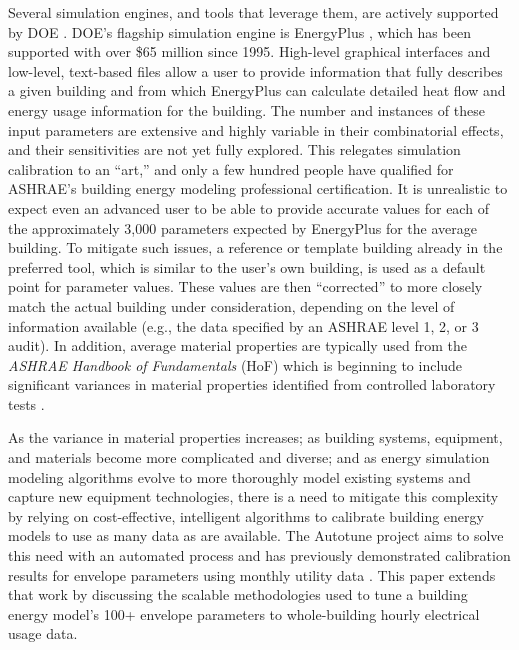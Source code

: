 \documentclass[preprint, review, 12pt]{elsarticle}
\begin{document}
Several simulation engines, and tools that leverage them, are actively supported by DOE \cite{cit:doetools2012}. DOE’s flagship simulation engine is EnergyPlus \cite{cit:energyplus}, which has been supported with over \$65 million since 1995. %
High-level graphical interfaces and low-level, text-based files allow a user to provide information that fully describes a given building and from which EnergyPlus can calculate detailed heat flow and energy usage information for the building. The number and instances of these input parameters are extensive and highly variable in their combinatorial effects, and their sensitivities are not yet fully explored. This relegates simulation calibration to an ``art,'' and only a few hundred people have qualified for ASHRAE's building energy modeling professional certification. It is unrealistic to expect even an advanced user to be able to provide accurate values for each of the approximately 3,000 parameters expected by EnergyPlus for the average building. To mitigate such issues, a reference or template building already in the preferred tool, which is similar to the user's own building, is used as a default point for parameter values. These values are then ``corrected'' to more closely match the actual building under consideration, depending on the level of information available (e.g., the data specified by an ASHRAE level 1, 2, or 3 audit). In addition, average material properties are typically used from the \textit{ASHRAE Handbook of Fundamentals} (HoF) which is beginning to include significant variances in material properties identified from controlled laboratory tests \cite{cit:ashrae2013}.

As the variance in material properties increases; as building systems, equipment, and materials become more complicated and diverse; and as energy simulation modeling algorithms evolve to more thoroughly model existing systems and capture new equipment technologies, there is a need to mitigate this complexity by relying on cost-effective, intelligent algorithms to calibrate building energy models to use as many data as are available. The Autotune project \cite{cit:new2012} aims to solve this need with an automated process and has previously demonstrated calibration results for envelope parameters using monthly utility data \cite{cit:garrett2013}. This paper extends that work by discussing the scalable methodologies used to tune a building energy model's 100+ envelope parameters to whole-building hourly electrical usage data.
\end{document}

